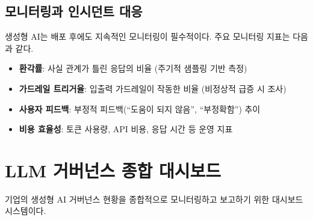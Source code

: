 \subsection{모니터링과 인시던트 대응}
\label{sec:gen.3.3}

생성형 AI는 배포 후에도 지속적인 모니터링이 필수적이다. 주요 모니터링 지표는 다음과 같다.

\begin{itemize}
 \item \textbf{환각률}: 사실 관계가 틀린 응답의 비율 (주기적 샘플링 기반 측정)
 \item \textbf{가드레일 트리거율}: 입출력 가드레일이 작동한 비율 (비정상적 급증 시 조사)
 \item \textbf{사용자 피드백}: 부정적 피드백(``도움이 되지 않음'', ``부정확함'') 추이
 \item \textbf{비용 효율성}: 토큰 사용량, API 비용, 응답 시간 등 운영 지표
\end{itemize}

\section{LLM 거버넌스 종합 대시보드}
\label{sec:gen.3.4}

기업의 생성형 AI 거버넌스 현황을 종합적으로 모니터링하고 보고하기 위한 대시보드 시스템이다.

